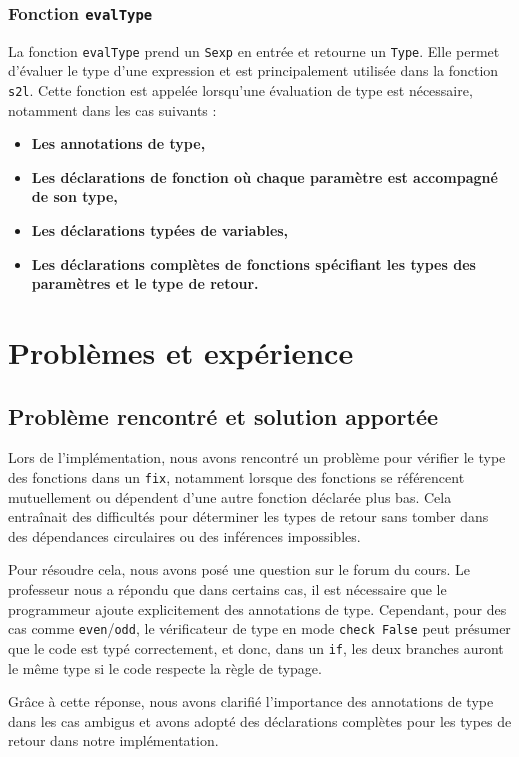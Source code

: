\documentclass{article}
\begin{document}
\subsubsection{Fonction \texttt{evalType}}
La fonction \texttt{evalType} prend un \texttt{Sexp} en entrée et retourne un \texttt{Type}. Elle permet d'évaluer le type d'une expression et est principalement utilisée dans la fonction \texttt{s2l}. Cette fonction est appelée lorsqu'une évaluation de type est nécessaire, notamment dans les cas suivants : 
\begin{itemize}
\item \textbf{Les annotations de type,}
\item \textbf{Les déclarations de fonction où chaque paramètre est accompagné de son type,}
\item \textbf{Les déclarations typées de variables,}
\item \textbf{Les déclarations complètes de fonctions spécifiant les types des paramètres et le type de retour.}
\end{itemize}


\section{Problèmes et expérience}
\subsection{Problème rencontré et solution apportée}
Lors de l'implémentation, nous avons rencontré un problème pour vérifier le type des fonctions dans un \texttt{fix}, notamment lorsque des fonctions se référencent mutuellement ou dépendent d'une autre fonction déclarée plus bas. Cela entraînait des difficultés pour déterminer les types de retour sans tomber dans des dépendances circulaires ou des inférences impossibles.

Pour résoudre cela, nous avons posé une question sur le forum du cours. Le professeur nous a répondu que dans certains cas, il est nécessaire que le programmeur ajoute explicitement des annotations de type. Cependant, pour des cas comme \texttt{even}/\texttt{odd}, le vérificateur de type en mode \texttt{check False} peut présumer que le code est typé correctement, et donc, dans un \texttt{if}, les deux branches auront le même type si le code respecte la règle de typage.

Grâce à cette réponse, nous avons clarifié l'importance des annotations de type dans les cas ambigus et avons adopté des déclarations complètes pour les types de retour dans notre implémentation.
\end{document}
